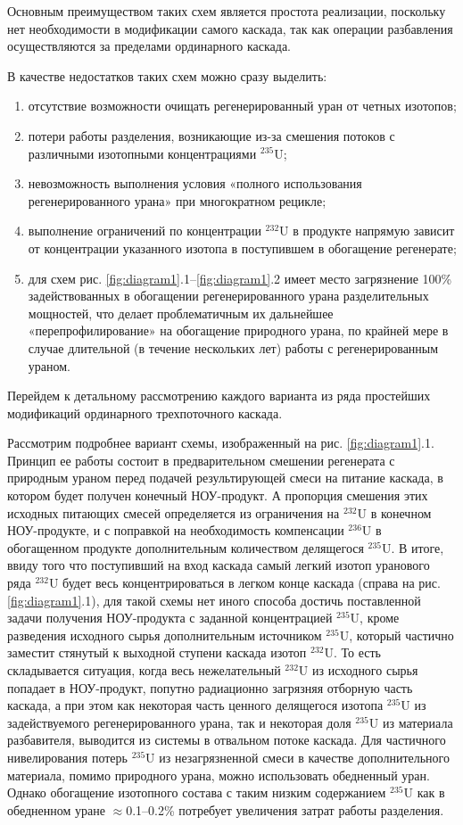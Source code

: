 Основным преимуществом таких схем является простота реализации, поскольку нет необходимости в модификации самого каскада, так как операции разбавления осуществляются за пределами ординарного каскада.

В качестве недостатков таких схем можно сразу выделить:
\begin{enumerate}
  \item отсутствие возможности очищать регенерированный уран от четных изотопов;
  \item потери работы разделения, возникающие из-за смешения потоков с различными изотопными концентрациями $^{235}$U;
  \item невозможность выполнения условия «полного использования регенерированного урана» при многократном рецикле;
  \item выполнение ограничений по концентрации $^{232}$U в продукте напрямую зависит от концентрации указанного изотопа в поступившем в обогащение регенерате;
  \item для схем рис. \ref{fig:diagram1}.1--\ref{fig:diagram1}.2 имеет место загрязнение 100\% задействованных в обогащении регенерированного урана разделительных мощностей, что делает проблематичным их дальнейшее «перепрофилирование» на обогащение природного урана, по крайней мере в случае длительной (в течение нескольких лет) работы с регенерированным ураном.
\end{enumerate}

Перейдем к детальному рассмотрению каждого варианта из ряда простейших модификаций ординарного трехпоточного каскада.

Рассмотрим подробнее вариант схемы, изображенный на рис. \ref{fig:diagram1}.1. Принцип ее работы состоит в предварительном смешении регенерата с природным ураном перед подачей результирующей смеси на питание каскада, в котором будет получен конечный НОУ-продукт. А пропорция смешения этих исходных питающих смесей определяется из ограничения на $^{232}$U в конечном НОУ-продукте, и с поправкой на необходимость компенсации $^{236}$U в обогащенном продукте дополнительным количеством делящегося $^{235}$U. В итоге, ввиду того что поступивший на вход каскада самый легкий изотоп уранового ряда $^{232}$U будет весь концентрироваться в легком конце каскада (справа на рис. \ref{fig:diagram1}.1), для такой схемы нет иного способа достичь поставленной задачи получения НОУ-продукта с заданной концентрацией $^{235}$U, кроме разведения исходного сырья дополнительным источником $^{235}$U, который частично заместит стянутый к выходной ступени каскада изотоп $^{232}$U. То есть складывается ситуация, когда весь нежелательный $^{232}$U из исходного сырья попадает в НОУ-продукт, попутно радиационно загрязняя отборную часть каскада, а при этом как некоторая часть ценного делящегося изотопа $^{235}$U из задействуемого регенерированного урана, так и некоторая доля $^{235}$U из материала разбавителя, выводится из системы в отвальном потоке каскада. Для частичного нивелирования потерь $^{235}$U из незагрязненной смеси в качестве дополнительного материала, помимо природного урана, можно использовать обедненный уран. Однако обогащение  изотопного состава с таким низким содержанием $^{235}$U как в обедненном уране $\approx$0.1--0.2\% потребует увеличения затрат работы разделения.

